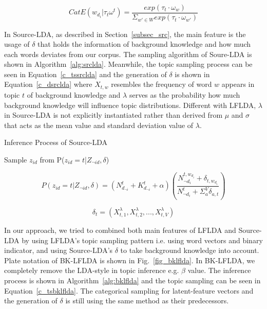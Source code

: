 \documentclass[senior]{IPSstyle}
\begin{document}
\begin{equation}
CatE(w_{d_i}|\tau_t\omega^t)= \frac{exp(\tau_t \cdot \omega_w)}{\Sigma_{w' \in W} exp(\tau_t \cdot \omega_{w'})}
\label{c_cslflda}
\end{equation}

In Source-LDA, as described in Section~\ref{subsec_src}, the main feature is the usage of $\delta$ that holds the information of background knowledge and how much each words deviates from our corpus. The sampling algorithm of Soure-LDA is shown in Algorithm~\ref{alg:srclda}. Meanwhile, the topic sampling process can be seen in Equation~\ref{c_tssrclda} and the generation of $\delta$ is shown in Equation~\ref{c_dsrclda} where $X_{t,w}$ resembles the frequency of word $w$ appears in topic $t$ of background knowledge and $\lambda$ serves as the probability how much background knowledge will influence topic distributions. Different with LFLDA, $\lambda$ in Source-LDA is not explicitly instantiated rather than derived from $\mu$ and $\sigma$ that acts as the mean value and standard deviation value of $\lambda$.

\begin{algorithm}[h]
\caption{Inference Process of Source-LDA}
\label{alg:srclda}
\begin{algorithmic}[1]
\State Sample $z_{id}$ from P($z_{id}=t$|$Z_{\neg id},\delta$)
\EndFor
\EndFor
\EndFor
\end{algorithmic}
\end{algorithm}

\begin{equation}
P(z_{id}=t|Z_{\neg id},\delta)=(N^{t}_{d_{\neg i}} + K^{t}_{d_{\neg i}} + \alpha)(\frac{N^{t,w_{d_i}}_{\neg  d_i}+\delta_{t,w_{d_i}}}{N^{t}_{\neg d_i}+\Sigma_a^V \delta_{a,t}})
\label{c_tssrclda}
\end{equation}

\begin{equation}
\delta_t = (X_{t,1}^\lambda,X_{t,2}^\lambda,...,X_{t,V}^\lambda) 
\label{c_dsrclda}
\end{equation}

In our approach, we tried to combined both main features of LFLDA and Source-LDA by using LFLDA's topic sampling pattern i.e. using word vectors and binary indicator, and using Source-LDA's $\delta$ to take background knowledge into account. Plate notation of BK-LFLDA is shown in Fig.~\ref{fig_bklflda}. In BK-LFLDA, we completely remove the LDA-style in topic inference e.g. $\beta$ value. The inference process is shown in Algorithm~\ref{alg:bklflda} and the topic sampling can be seen in Equation~\ref{c_tsbklflda}. The categorical sampling for latent-feature vectors and the generation of $\delta$ is still using the same method as their predecessors.
\end{document}
